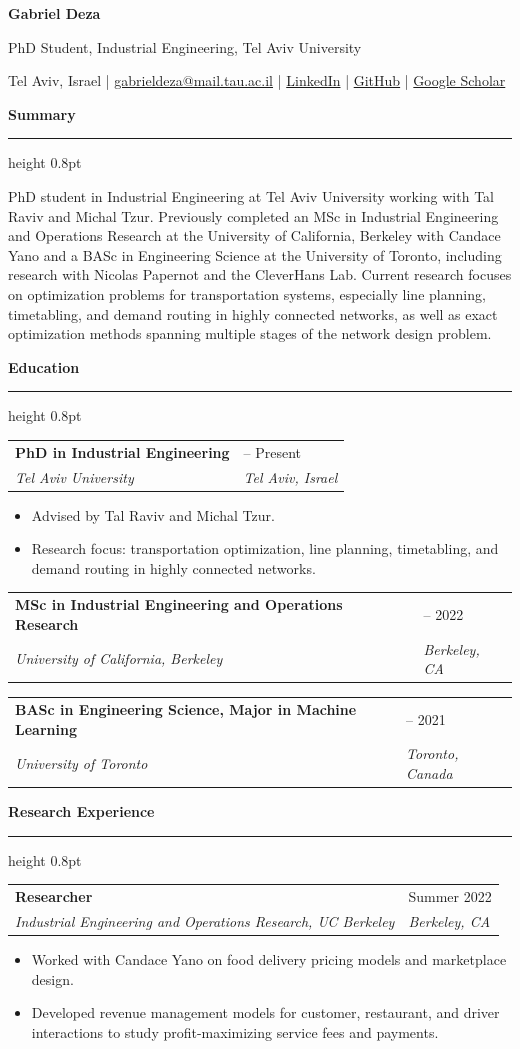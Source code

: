 \documentclass[10pt]{article}
\makeatletter
\newcommand{\cvsection}[1]{%
  \vspace{0.7em}%
  {\large\bfseries #1}\par
  \vspace{0.15em}%
  {\color{SectionRule}\hrule height 0.8pt}%
  \vspace{0.35em}%
}
\newcommand{\cventry}[4]{%
  \begin{tabularx}{\textwidth}{@{}X>{\raggedleft\arraybackslash}p{0.28\textwidth}@{}}
    \textbf{#1} & #2 \\
    \textit{#3} & \textit{#4} \\
  \end{tabularx}
}
\makeatother
\begin{document}
{\LARGE \textbf{Gabriel Deza}}\par
{\normalsize PhD Student, Industrial Engineering, Tel Aviv University}\par
{\small Tel Aviv, Israel \enspace | \enspace
\href{mailto:gabrieldeza@mail.tau.ac.il}{gabrieldeza@mail.tau.ac.il} \enspace | \enspace
\href{https://www.linkedin.com/in/gabrieldeza/}{LinkedIn} \enspace | \enspace
\href{https://github.com/GabrielDeza}{GitHub} \enspace | \enspace
\href{https://scholar.google.com/scholar?q=Gabriel+Deza}{Google Scholar}}\par

\cvsection{Summary}
PhD student in Industrial Engineering at Tel Aviv University working with Tal Raviv and Michal Tzur. Previously completed an MSc in Industrial Engineering and Operations Research at the University of California, Berkeley with Candace Yano and a BASc in Engineering Science at the University of Toronto, including research with Nicolas Papernot and the CleverHans Lab. Current research focuses on optimization problems for transportation systems, especially line planning, timetabling, and demand routing in highly connected networks, as well as exact optimization methods spanning multiple stages of the network design problem.

\cvsection{Education}
\cventry{PhD in Industrial Engineering}{2022 -- Present}{Tel Aviv University}{Tel Aviv, Israel}
\begin{itemize}
  \item Advised by Tal Raviv and Michal Tzur.
  \item Research focus: transportation optimization, line planning, timetabling, and demand routing in highly connected networks.
\end{itemize}

\cventry{MSc in Industrial Engineering and Operations Research}{2021 -- 2022}{University of California, Berkeley}{Berkeley, CA}

\cventry{BASc in Engineering Science, Major in Machine Learning}{2017 -- 2021}{University of Toronto}{Toronto, Canada}

\cvsection{Research Experience}
\cventry{Researcher}{Summer 2022}{Industrial Engineering and Operations Research, UC Berkeley}{Berkeley, CA}
\begin{itemize}
  \item Worked with Candace Yano on food delivery pricing models and marketplace design.
  \item Developed revenue management models for customer, restaurant, and driver interactions to study profit-maximizing service fees and payments.
\end{itemize}
\end{document}
